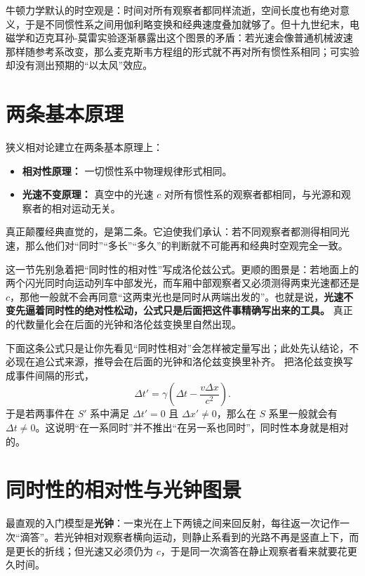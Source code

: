 \documentclass[lang=cn,11pt]{elegantbook}
\newcommand{\bridge}[1]{\begin{note}#1\end{note}}
\begin{document}
牛顿力学默认的时空观是：时间对所有观察者都同样流逝，空间长度也有绝对意义，于是不同惯性系之间用伽利略变换和经典速度叠加就够了。但十九世纪末，电磁学和迈克耳孙-莫雷实验逐渐暴露出这个图景的矛盾：若光速会像普通机械波速那样随参考系改变，那么麦克斯韦方程组的形式就不再对所有惯性系相同；可实验却没有测出预期的“以太风”效应。

\section{两条基本原理}

狭义相对论建立在两条基本原理上：
\begin{itemize}
 \item \textbf{相对性原理：} 一切惯性系中物理规律形式相同。
 \item \textbf{光速不变原理：} 真空中的光速 \(c\) 对所有惯性系的观察者都相同，与光源和观察者的相对运动无关。
\end{itemize}

真正颠覆经典直觉的，是第二条。它迫使我们承认：若不同观察者都测得相同光速，那么他们对“同时”“多长”“多久”的判断就不可能再和经典时空观完全一致。
\bridge{这一节先别急着把“同时性的相对性”写成洛伦兹公式。更顺的图景是：若地面上的两个闪光同时向运动列车中部发光，而车厢中部观察者又必须测得两束光速都还是 \(c\)，那他一般就不会再同意“这两束光也是同时从两端出发的”。也就是说，\textbf{光速不变先逼着同时性的绝对性松动，公式只是后面把这件事精确写出来的工具。} 真正的代数量化会在后面的光钟和洛伦兹变换里自然出现。}

\begin{remark}
下面这条公式只是让你先看见“同时性相对”会怎样被定量写出；此处先认结论，不必现在追公式来源，推导会在后面的光钟和洛伦兹变换里补齐。
把洛伦兹变换写成事件间隔的形式，
\[
\Delta t'=\gamma\left(\Delta t-\frac{v\Delta x}{c^2}\right).
\]
于是若两事件在 \(S'\) 系中满足 \(\Delta t'=0\) 且 \(\Delta x'\neq 0\)，那么在 \(S\) 系里一般就会有 \(\Delta t\neq 0\)。这说明“在一系同时”并不推出“在另一系也同时”，同时性本身就是相对的。
\end{remark}

\section{同时性的相对性与光钟图景}

最直观的入门模型是\textbf{光钟}：一束光在上下两镜之间来回反射，每往返一次记作一次“滴答”。若光钟相对观察者横向运动，则静止系看到的光路不再是竖直上下，而是更长的折线；但光速又必须仍为 \(c\)，于是同一次滴答在静止观察者看来就要花更久时间。
\end{document}
